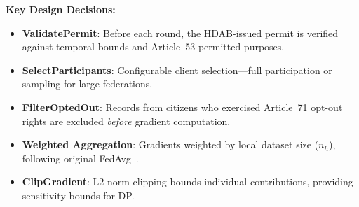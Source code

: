 \documentclass[conference,a4paper]{IEEEtran}
\begin{document}
\textbf{Key Design Decisions:}
\begin{itemize}
    \item \textbf{ValidatePermit}: Before each round, the HDAB-issued permit is verified against temporal bounds and Article~53 permitted purposes.
    \item \textbf{SelectParticipants}: Configurable client selection---full participation or sampling for large federations.
    \item \textbf{FilterOptedOut}: Records from citizens who exercised Article~71 opt-out rights are excluded \textit{before} gradient computation.
    \item \textbf{Weighted Aggregation}: Gradients weighted by local dataset size ($n_h$), following original FedAvg~\cite{mcmahan2017communication}.
    \item \textbf{ClipGradient}: L2-norm clipping bounds individual contributions, providing sensitivity bounds for DP.
\end{itemize}
\end{document}

